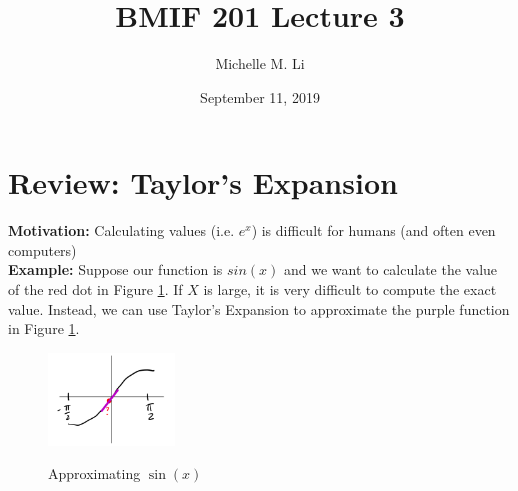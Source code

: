 \documentclass[12pt]{extarticle}
\title{BMIF 201 Lecture 3}
\author{Michelle M. Li}
\date{September 11, 2019}
\newcommand{\<}{\langle}
\renewcommand{\>}{\rangle}
\theoremstyle{definition}
\begin{document}
\maketitle

\section{Review: Taylor's Expansion}

\textbf{Motivation:} Calculating values (i.e. $e^x$) is difficult for humans (and often even computers)\\

\noindent \textbf{Example:} Suppose our function is $sin(x)$ and we want to calculate the value of the red dot in Figure \ref{fig1}. If $X$ is large, it is very difficult to compute the exact value. Instead, we can use Taylor's Expansion to approximate the purple function in Figure \ref{fig1}.

\begin{figure}[h]
\caption{Approximating $\sin (x)$}
\centering
\includegraphics[width=0.3\textwidth]{fig1.png}
\label{fig1}
\end{figure}
\end{document}
